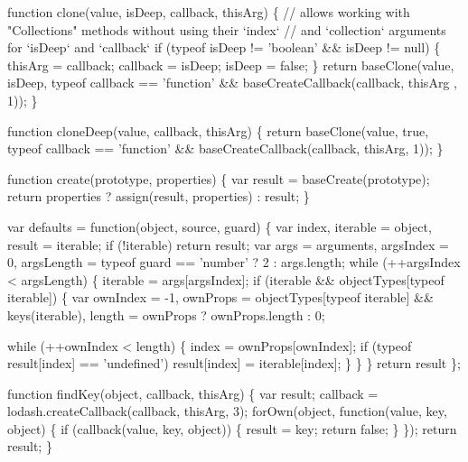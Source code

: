 \begin{DoxyCodeInclude}
    \textcolor{keyword}{function} clone(value, isDeep, callback, thisArg) \{
      \textcolor{comment}{// allows working with "Collections" methods without using their `index`}
      \textcolor{comment}{// and `collection` arguments for `isDeep` and `callback`}
      \textcolor{keywordflow}{if} (typeof isDeep != \textcolor{stringliteral}{'boolean'} && isDeep != null) \{
        thisArg = callback;
        callback = isDeep;
        isDeep = \textcolor{keyword}{false};
      \}
      \textcolor{keywordflow}{return} baseClone(value, isDeep, typeof callback == \textcolor{stringliteral}{'function'} && baseCreateCallback(callback, thisArg
      , 1));
    \}

    \textcolor{keyword}{function} cloneDeep(value, callback, thisArg) \{
      \textcolor{keywordflow}{return} baseClone(value, \textcolor{keyword}{true}, typeof callback == \textcolor{stringliteral}{'function'} && baseCreateCallback(callback, thisArg, 
      1));
    \}

    \textcolor{keyword}{function} create(prototype, properties) \{
      var result = baseCreate(prototype);
      \textcolor{keywordflow}{return} properties ? assign(result, properties) : result;
    \}

    var defaults = \textcolor{keyword}{function}(object, source, guard) \{
      var index, iterable = object, result = iterable;
      \textcolor{keywordflow}{if} (!iterable) \textcolor{keywordflow}{return} result;
      var args = arguments,
          argsIndex = 0,
          argsLength = typeof guard == \textcolor{stringliteral}{'number'} ? 2 : args.length;
      \textcolor{keywordflow}{while} (++argsIndex < argsLength) \{
        iterable = args[argsIndex];
        \textcolor{keywordflow}{if} (iterable && objectTypes[typeof iterable]) \{
        var ownIndex = -1,
            ownProps = objectTypes[typeof iterable] && keys(iterable),
            length = ownProps ? ownProps.length : 0;

        \textcolor{keywordflow}{while} (++ownIndex < length) \{
          index = ownProps[ownIndex];
          \textcolor{keywordflow}{if} (typeof result[index] == \textcolor{stringliteral}{'undefined'}) result[index] = iterable[index];
        \}
        \}
      \}
      \textcolor{keywordflow}{return} result
    \};

    \textcolor{keyword}{function} findKey(\textcolor{keywordtype}{object}, callback, thisArg) \{
      var result;
      callback = lodash.createCallback(callback, thisArg, 3);
      forOwn(\textcolor{keywordtype}{object}, \textcolor{keyword}{function}(value, key, \textcolor{keywordtype}{object}) \{
        \textcolor{keywordflow}{if} (callback(value, key, \textcolor{keywordtype}{object})) \{
          result = key;
          \textcolor{keywordflow}{return} \textcolor{keyword}{false};
        \}
      \});
      \textcolor{keywordflow}{return} result;
    \}


\end{DoxyCodeInclude}

